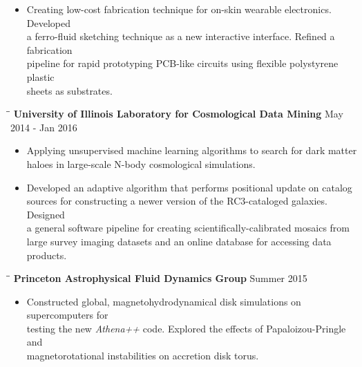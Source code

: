 \documentclass{res}
\begin{document}
\begin{resume}
\begin{itemize}
     \item Creating low-cost fabrication technique for on-skin wearable electronics.  Developed \\a ferro-fluid sketching technique as a new interactive interface. Refined a fabrication \\pipeline for rapid prototyping PCB-like circuits using flexible polystyrene plastic \\sheets as substrates.
     \end{itemize}
     \vspace{-15pt}
   \begin{tabbing}
   \hspace{2.3in}\= \hspace{2.6in}\= \kill 
    {\bf  University of Illinois Laboratory for Cosmological Data Mining}  \> \>\hspace{7pt} May 2014 - Jan 2016
   \\
   \end{tabbing}\vspace{-20pt}    
     \begin{itemize}
     \item Applying unsupervised machine learning algorithms to search for dark matter \\haloes in  large-scale N-body cosmological simulations.
     \item  Developed an adaptive algorithm that performs positional update on catalog \\sources for constructing a newer version of the RC3-cataloged galaxies. Designed \\a general software pipeline for creating scientifically-calibrated mosaics from \\large survey imaging datasets and an online database for accessing data products.  
     \end{itemize}
       \vspace{-15pt}
\begin{tabbing}
   \hspace{2.3in}\= \hspace{2.6in}\= \kill 
   \vspace{-30pt}
    {\bf Princeton Astrophysical Fluid Dynamics Group}  \>\> \hspace{34pt} Summer 2015 
    \\ 
   \end{tabbing}    
    \begin{itemize}
     \vspace{-20pt}
     \item Constructed global, magnetohydrodynamical disk simulations on supercomputers for \\testing the new \textit{Athena++} code. Explored the effects of Papaloizou-Pringle and \\magnetorotational instabilities on accretion disk torus. 
     \end{itemize}    \vspace{-10pt}   

\end{resume}
\end{document}
